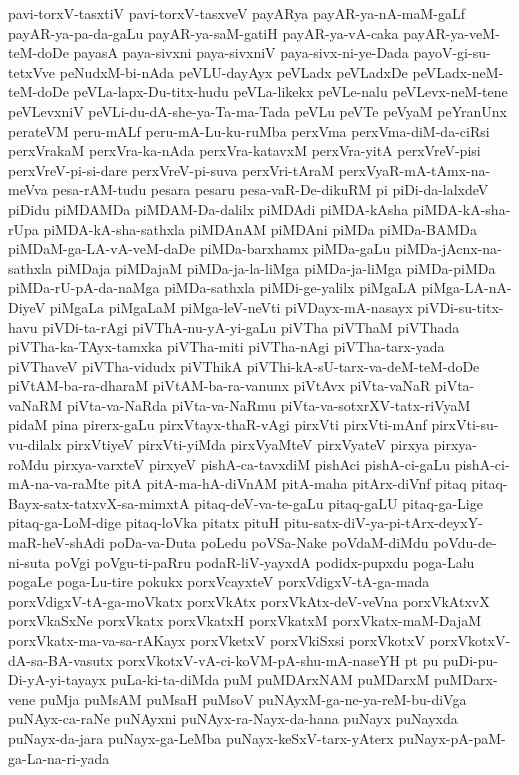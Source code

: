 {pavi-torxV-tasxtiV
pavi-torxV-tasxveV
payARya
payAR-ya-nA-maM-gaLf
payAR-ya-pa-da-gaLu
payAR-ya-saM-gatiH
payAR-ya-vA-caka
payAR-ya-veM-teM-doDe
payasA
paya-sivxni
paya-sivxniV
paya-sivx-ni-ye-Dada
payoV-gi-su-tetxVve
peNudxM-bi-nAda
peVLU-dayAyx
peVLadx
peVLadxDe
peVLadx-neM-teM-doDe
peVLa-lapx-Du-titx-hudu
peVLa-likekx
peVLe-nalu
peVLevx-neM-tene
peVLevxniV
peVLi-du-dA-she-ya-Ta-ma-Tada
peVLu
peVTe
peVyaM
peYranUnx
perateVM
peru-mALf
peru-mA-Lu-ku-ruMba
perxVma
perxVma-diM-da-ciRsi
perxVrakaM
perxVra-ka-nAda
perxVra-katavxM
perxVra-yitA
perxVreV-pisi
perxVreV-pi-si-dare
perxVreV-pi-suva
perxVri-tAraM
perxVyaR-mA-tAmx-na-meVva
pesa-rAM-tudu
pesara
pesaru
pesa-vaR-De-dikuRM
pi
piDi-da-lalxdeV
piDidu
piMDAMDa
piMDAM-Da-dalilx
piMDAdi
piMDA-kAsha
piMDA-kA-sha-rUpa
piMDA-kA-sha-sathxla
piMDAnAM
piMDAni
piMDa
piMDa-BAMDa
piMDaM-ga-LA-vA-veM-daDe
piMDa-barxhamx
piMDa-gaLu
piMDa-jAcnx-na-sathxla
piMDaja
piMDajaM
piMDa-ja-la-liMga
piMDa-ja-liMga
piMDa-piMDa
piMDa-rU-pA-da-naMga
piMDa-sathxla
piMDi-ge-yalilx
piMgaLA
piMga-LA-nA-DiyeV
piMgaLa
piMgaLaM
piMga-leV-neVti
piVDayx-mA-nasayx
piVDi-su-titx-havu
piVDi-ta-rAgi
piVThA-nu-yA-yi-gaLu
piVTha
piVThaM
piVThada
piVTha-ka-TAyx-tamxka
piVTha-miti
piVTha-nAgi
piVTha-tarx-yada
piVThaveV
piVTha-vidudx
piVThikA
piVThi-kA-sU-tarx-va-deM-teM-doDe
piVtAM-ba-ra-dharaM
piVtAM-ba-ra-vanunx
piVtAvx
piVta-vaNaR
piVta-vaNaRM
piVta-va-NaRda
piVta-va-NaRmu
piVta-va-sotxrXV-tatx-riVyaM
pidaM
pina
pirerx-gaLu
pirxVtayx-thaR-vAgi
pirxVti
pirxVti-mAnf
pirxVti-su-vu-dilalx
pirxVtiyeV
pirxVti-yiMda
pirxVyaMteV
pirxVyateV
pirxya
pirxya-roMdu
pirxya-varxteV
pirxyeV
pishA-ca-tavxdiM
pishAci
pishA-ci-gaLu
pishA-ci-mA-na-va-raMte
pitA
pitA-ma-hA-diVnAM
pitA-maha
pitArx-diVnf
pitaq
pitaq-Bayx-satx-tatxvX-sa-mimxtA
pitaq-deV-va-te-gaLu
pitaq-gaLU
pitaq-ga-Lige
pitaq-ga-LoM-dige
pitaq-loVka
pitatx
pituH
pitu-satx-diV-ya-pi-tArx-deyxY-maR-heV-shAdi
poDa-va-Duta
poLedu
poVSa-Nake
poVdaM-diMdu
poVdu-de-ni-suta
poVgi
poVgu-ti-paRru
podaR-liV-yayxdA
podidx-pupxdu
poga-Lalu
pogaLe
poga-Lu-tire
pokukx
porxVcayxteV
porxVdigxV-tA-ga-mada
porxVdigxV-tA-ga-moVkatx
porxVkAtx
porxVkAtx-deV-veVna
porxVkAtxvX
porxVkaSxNe
porxVkatx
porxVkatxH
porxVkatxM
porxVkatx-maM-DajaM
porxVkatx-ma-va-sa-rAKayx
porxVketxV
porxVkiSxsi
porxVkotxV
porxVkotxV-dA-sa-BA-vasutx
porxVkotxV-vA-ci-koVM-pA-shu-mA-naseYH
pt
pu
puDi-pu-Di-yA-yi-tayayx
puLa-ki-ta-diMda
puM
puMDArxNAM
puMDarxM
puMDarx-vene
puMja
puMsAM
puMsaH
puMsoV
puNAyxM-ga-ne-ya-reM-bu-diVga
puNAyx-ca-raNe
puNAyxni
puNAyx-ra-Nayx-da-hana
puNayx
puNayxda
puNayx-da-jara
puNayx-ga-LeMba
puNayx-keSxV-tarx-yAterx
puNayx-pA-paM-ga-La-na-ri-yada
}
